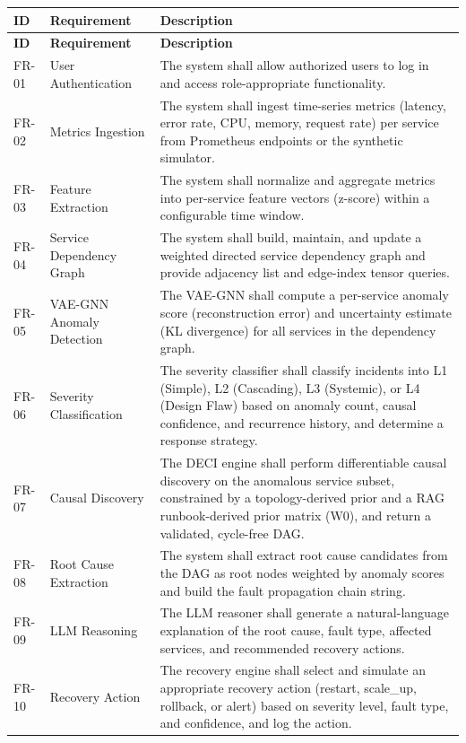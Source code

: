 \documentclass[11pt,a4paper]{article}
\begin{document}
\begin{longtable}{|C{1.6cm}|L{4.0cm}|L{9.6cm}|}
\hline
\textbf{ID} & \textbf{Requirement} & \textbf{Description} \\
\hline
\endfirsthead
\hline
\textbf{ID} & \textbf{Requirement} & \textbf{Description} \\
\hline
\endhead

FR-01 & User Authentication & The system shall allow authorized users to log in and access role-appropriate functionality. \\ \hline
FR-02 & Metrics Ingestion & The system shall ingest time-series metrics (latency, error rate, CPU, memory, request rate) per service from Prometheus endpoints or the synthetic simulator. \\ \hline
FR-03 & Feature Extraction & The system shall normalize and aggregate metrics into per-service feature vectors (z-score) within a configurable time window. \\ \hline
FR-04 & Service Dependency Graph & The system shall build, maintain, and update a weighted directed service dependency graph and provide adjacency list and edge-index tensor queries. \\ \hline
FR-05 & VAE-GNN Anomaly Detection & The VAE-GNN shall compute a per-service anomaly score (reconstruction error) and uncertainty estimate (KL divergence) for all services in the dependency graph. \\ \hline
FR-06 & Severity Classification & The severity classifier shall classify incidents into L1 (Simple), L2 (Cascading), L3 (Systemic), or L4 (Design Flaw) based on anomaly count, causal confidence, and recurrence history, and determine a response strategy. \\ \hline
FR-07 & Causal Discovery & The DECI engine shall perform differentiable causal discovery on the anomalous service subset, constrained by a topology-derived prior and a RAG runbook-derived prior matrix (W0), and return a validated, cycle-free DAG. \\ \hline
FR-08 & Root Cause Extraction & The system shall extract root cause candidates from the DAG as root nodes weighted by anomaly scores and build the fault propagation chain string. \\ \hline
FR-09 & LLM Reasoning & The LLM reasoner shall generate a natural-language explanation of the root cause, fault type, affected services, and recommended recovery actions. \\ \hline
FR-10 & Recovery Action & The recovery engine shall select and simulate an appropriate recovery action (restart, scale\_up, rollback, or alert) based on severity level, fault type, and confidence, and log the action. \\ \hline

\end{longtable}
\end{document}
